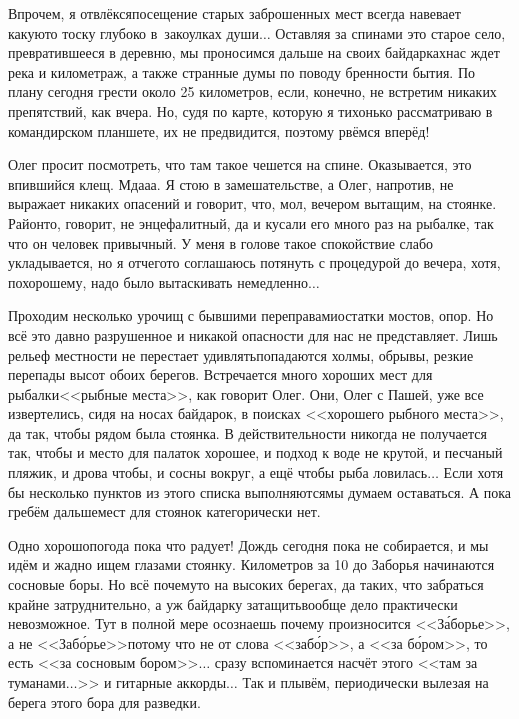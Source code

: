 Впрочем, я отвлёкся\mdash посещение старых заброшенных мест всегда навевает какую\sdash то тоску глубоко в~закоулках души$\ldots$ Оставляя за спинами это старое село, превратившееся в деревню, мы проносимся дальше на своих байдарках\mdash нас ждет река и километраж, а также странные думы по поводу бренности бытия. По плану сегодня грести около 25 километров, если, конечно, не встретим никаких препятствий, как вчера. Но, судя по карте, которую я тихонько рассматриваю в командирском планшете, их не предвидится, поэтому рвёмся вперёд!

Олег просит посмотреть, что там такое чешется на спине. Оказывается, это впившийся клещ. Мда\sdash а\sdash а. Я стою в замешательстве, а Олег, напротив, не выражает никаких опасений и говорит, что, мол, вечером вытащим, на стоянке. Район\sdash то, говорит, не энцефалитный, да и кусали его много раз на рыбалке, так что он человек привычный. У меня в голове такое спокойствие слабо укладывается, но я отчего\sdash то соглашаюсь потянуть с процедурой до вечера, хотя, по\sdash хорошему, надо было вытаскивать немедленно$\ldots$

Проходим несколько урочищ с бывшими переправами\mdash остатки мостов, опор. Но всё это давно разрушенное и никакой опасности для нас не представляет. Лишь рельеф местности не перестает удивлять\mdash попадаются холмы, обрывы, резкие перепады высот обоих берегов. Встречается много хороших мест для рыбалки\mdash <<рыбные места>>, как говорит Олег. Они, Олег с Пашей, уже все извертелись, сидя на носах байдарок, в поисках <<хорошего рыбного места>>, да так, чтобы рядом была стоянка. В действительности никогда не получается так, чтобы и место для палаток хорошее, и подход к воде не крутой, и песчаный пляжик, и дрова чтобы, и сосны вокруг, а ещё чтобы рыба ловилась$\ldots$ Если хотя бы несколько пунктов из этого списка выполняются\mdash мы думаем оставаться. А пока гребём дальше\mdash мест для стоянок категорически нет.

Одно хорошо\mdash погода пока что радует! Дождь сегодня пока не собирается, и мы идём и жадно ищем глазами стоянку. Километров за 10 до Заборья начинаются сосновые боры. Но всё почему\sdash то на высоких берегах, да таких, что забраться крайне затруднительно, а уж байдарку затащить\mdash вообще дело практически невозможное. Тут в полной мере осознаешь почему произносится <<З\'{а}борье>>, а не <<Заб\'{о}рье>>\mdash потому что не от слова <<заб\'{о}р>>, а <<за б\'{о}ром>>, то есть <<за сосновым бором>>$\ldots$ сразу вспоминается насчёт этого <<там за туманами$\ldots$>> и гитарные аккорды$\ldots$ Так и плывём, периодически вылезая на берега этого бора для разведки.

